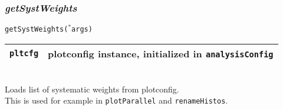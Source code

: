 \documentclass[12pt, a4paper]{article}
\newcommand{\args}{$^*$args}
\begin{document}
\subsubsection{\textit{getSystWeights}}
\texttt{getSystWeights(\args)}\\
\begin{tabular}{r|l}
\hline
\texttt{pltcfg} & plotconfig instance, initialized in \texttt{analysisConfig}\\
\hline
\end{tabular}
\\
Loads list of systematic weights from plotconfig.\\
This is used for example in \texttt{plotParallel} and \texttt{renameHistos}.
\end{document}
